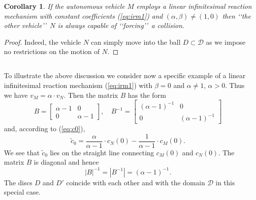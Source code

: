 \documentclass[11pt]{amsart}
\newtheorem{corollary}[theorem]{Corollary}
\newtheorem{remark}[theorem]{Remark}
\def\R{\mathbb R}
\begin{document}
{%
\begin{corollary}\label{cor:62}
If the autonomous vehicle $M$ employs a linear infinitesimal reaction mechanism with constant coefficients (\ref{eq:irm1}) and $(\alpha, \beta)\not= (1, 0)$ 
then \lq\lq the other vehicle\rq\rq\ $N$ is always capable of {\it \lq\lq forcing\rq\rq}\ a collision. 
\end{corollary}
\begin{proof}
Indeed, the vehicle $N$ can simply move into the ball $D\subset\mathcal D$ as we impose no restrictions on the motion of $N$. 
\end{proof}
\subsection{} To illustrate the above discussion we consider now a specific example of a linear infinitesimal reaction mechanism (\ref{eq:irm1}) with $\beta=0$ and $\alpha\not=1$, $\alpha>0$.  Thus we have $v_M=\alpha\cdot v_N$. Then the matrix $B$ has the form
$$B=\left[ 
\begin{array}{cc}
\alpha-1 & 0\\
0&\alpha-1
\end{array}
\right],\quad  B^{-1}=\left[ 
\begin{array}{cc}
(\alpha-1)^{-1} & 0\\
0&(\alpha-1)^{-1}
\end{array}
\right]$$ and, according to (\ref{eq:c0}),
\begin{equation}\label{eq:49a}
\tilde c_0=\frac{\alpha}{\alpha-1}\cdot c_N(0) - \frac{1}{\alpha-1}\cdot c_M(0).
\end{equation}
We see that $\tilde c_0$ lies on the straight line connecting $c_M(0)$ and $c_N(0)$. The matrix $B$ is diagonal and hence 
$$|B|^{-1}=|B^{-1}|=(\alpha-1)^{-1}.$$
The discs $D$ and $D'$ coincide with each other and with the domain $\mathcal D$ in this special case. 

}
\end{document}
